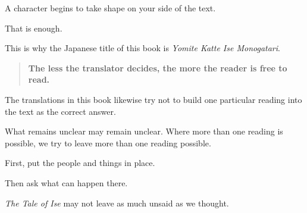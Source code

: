 A character begins to take shape on your side of the text.

That is enough.

This is why the Japanese title of this book is
\textit{Yomite Katte Ise Monogatari}.

\begin{quote}
\textbf{The less the translator decides,
the more the reader is free to read.}
\end{quote}

The translations in this book likewise try not to build
one particular reading into the text as the correct answer.

What remains unclear may remain unclear.
Where more than one reading is possible,
we try to leave more than one reading possible.

First, put the people and things in place.

Then ask what can happen there.

\textit{The Tale of Ise} may not leave
as much unsaid as we thought.

\fi
